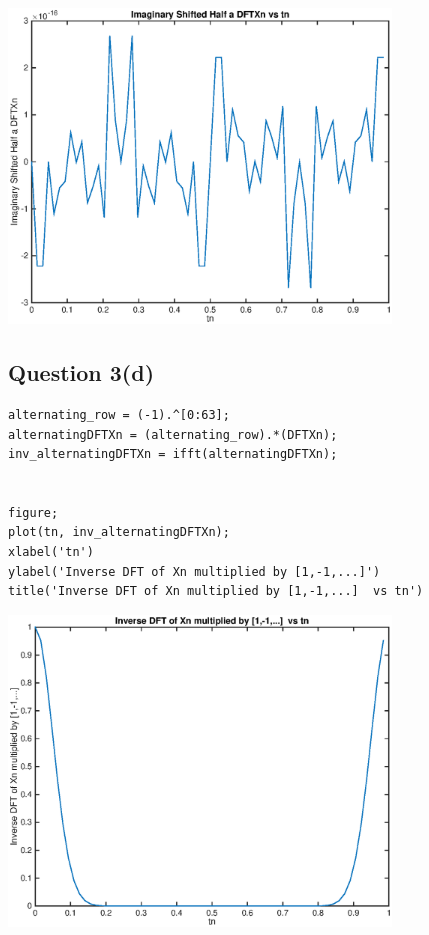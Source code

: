 \documentclass{article}
\begin{document}
\includegraphics [width=4in]{untitled_11.eps}


\subsection*{Question 3(d)}

\begin{verbatim}
alternating_row = (-1).^[0:63];
alternatingDFTXn = (alternating_row).*(DFTXn);
inv_alternatingDFTXn = ifft(alternatingDFTXn);


figure;
plot(tn, inv_alternatingDFTXn);
xlabel('tn')
ylabel('Inverse DFT of Xn multiplied by [1,-1,...]')
title('Inverse DFT of Xn multiplied by [1,-1,...]  vs tn')
\end{verbatim}

\includegraphics [width=4in]{untitled_12.eps}
\end{document}
